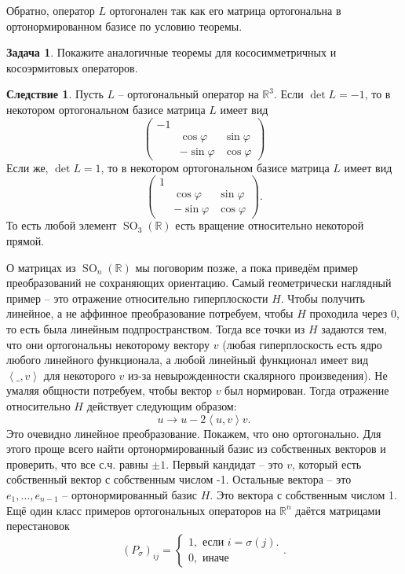 \documentclass[10pt,a4paper,oneside]{book} %
\theoremstyle{definition}
\newtheorem{zad}{Задача}
\newtheorem{cor}{Следствие}
\newcommand{\mb}[1]{\mathbb{#1}}
\newcommand{\SO}{\operatorname{SO}}
\def\lan{\left\langle }
\def\ran{\right\rangle}
\def\zd{\begin{zad}}
\def\ezd{\end{zad}}
\def\crl{\begin{cor}}
\def\ecrl{\end{cor}}
\begin{document}
Обратно, оператор $L$ ортогонален так как его матрица ортогональна в ортонормированном базисе по условию теоремы. 
\endproof




\zd Покажите аналогичные теоремы для кососимметричных и косоэрмитовых операторов.
\ezd

\crl Пусть $L$ -- ортогональный оператор на $\mb R^3$. Если $\det L=-1$, то в некотором ортогональном базисе матрица $L$ имеет вид 
$$\begin{pmatrix}
- 1 &&\\
&\cos \varphi & \sin \varphi\\
&-\sin \varphi &\cos \varphi
\end{pmatrix}$$
Если же, $\det L=1$, то в некотором ортогональном базисе матрица $L$ имеет вид 
$$\begin{pmatrix}
1 &&\\
&\cos \varphi & \sin \varphi\\
&-\sin \varphi &\cos \varphi
\end{pmatrix}.$$
То есть любой элемент $\SO_3(\mb R)$ есть вращение относительно некоторой прямой. 
\ecrl

О матрицах из $\SO_n(\mb R)$ мы поговорим позже, а пока приведём пример преобразований не сохраняющих ориентацию. Самый геометрически наглядный пример -- это отражение относительно гиперплоскости $H$. Чтобы получить линейное, а не аффинное преобразование потребуем, чтобы $H$ проходила через 0, то есть была линейным подпространством. Тогда все точки из $H$ задаются тем, что они ортогональны некоторому вектору $v$ (любая гиперплоскость есть ядро любого линейного функционала, а любой линейный функционал имеет вид $\lan \_ ,v \ran$ для некоторого $v$ из-за невырожденности скалярного произведения). Не умаляя общности потребуем, чтобы вектор $v$ был нормирован. Тогда отражение относительно $H$ действует следующим образом:
$$u \to u - 2 \lan u,v\ran v.$$
Это очевидно линейное преобразование. Покажем, что оно ортогонально. Для этого проще всего найти ортонормированный базис из собственных векторов и проверить, что все с.ч. равны $\pm 1$. Первый кандидат -- это $v$, который есть собственный вектор с собственным числом -1. Остальные вектора -- это $e_1,\dots, e_{n-1}$ -- ортонормированный базис $H$. Это вектора с собственным числом 1. \\

Ещё один класс примеров ортогональных операторов на $\mb R^n$ даётся матрицами перестановок $$(P_{\sigma})_{ij}=\begin{cases} 1, \text{ если $i=\sigma(j)$}.\\
0, \text{ иначе}
\end{cases}. $$  
\end{document}
